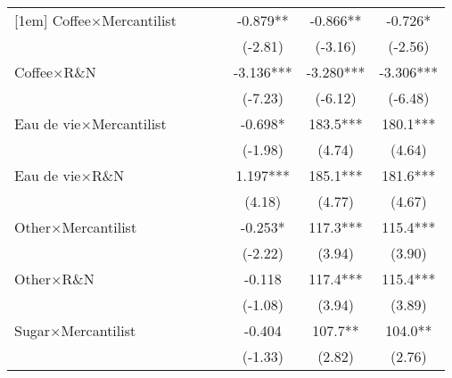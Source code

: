 {\begin{tabular}{l*{6}{c}}
[1em]
Coffee$\times$Mercantilist&                     &                     &                     &      -0.879** &      -0.866** &      -0.726*  \\
                    &                     &                     &                     &     (-2.81)         &     (-3.16)         &     (-2.56)         \\
[1em]
Coffee$\times$R\&N&                     &                     &                     &      -3.136***&      -3.280***&      -3.306***\\
                    &                     &                     &                     &     (-7.23)         &     (-6.12)         &     (-6.48)         \\
[1em]
Eau de vie$\times$Mercantilist&                     &                     &                     &      -0.698*  &       183.5***&       180.1***\\
                    &                     &                     &                     &     (-1.98)         &      (4.74)         &      (4.64)         \\
[1em]
Eau de vie$\times$R\&N&                     &                     &                     &       1.197***&       185.1***&       181.6***\\
                    &                     &                     &                     &      (4.18)         &      (4.77)         &      (4.67)         \\
[1em]
Other$\times$Mercantilist&                     &                     &                     &      -0.253*  &       117.3***&       115.4***\\
                    &                     &                     &                     &     (-2.22)         &      (3.94)         &      (3.90)         \\
[1em]
Other$\times$R\&N&                     &                     &                     &      -0.118         &       117.4***&       115.4***\\
                    &                     &                     &                     &     (-1.08)         &      (3.94)         &      (3.89)         \\
[1em]
Sugar$\times$Mercantilist&                     &                     &                     &      -0.404         &       107.7** &       104.0** \\
                    &                     &                     &                     &     (-1.33)         &      (2.82)         &      (2.76)         \\

\end{tabular}}
